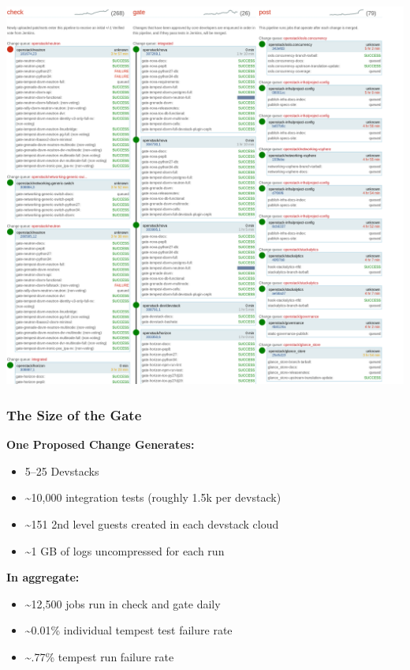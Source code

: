 \documentclass[aspectratio=43,11pt,hyperref={colorlinks=true}]{beamer}
\begin{document}
\begin{frame}
\begin{center}
    \includegraphics[width=.8\textwidth]{ZuulStatus.png}
\end{center}
\end{frame}

\begin{frame}
\frametitle{The Size of the Gate}
    \textbf{One Proposed Change Generates:}
      \begin{itemize}
        \item 5--25 Devstacks
        \item \textasciitilde10,000 integration tests (roughly 1.5k per devstack)
        \item \textasciitilde151 2nd level guests created in each devstack cloud
        \item \textasciitilde1 GB of logs uncompressed for each run
      \end{itemize}
      \textbf{In aggregate:}
      \begin{itemize}
        \item \textasciitilde12,500 jobs run in check and gate daily
        \item \textasciitilde0.01\% individual tempest test failure rate
        \item \textasciitilde.77\% tempest run failure rate
      \end{itemize}
\end{frame}
\end{document}
